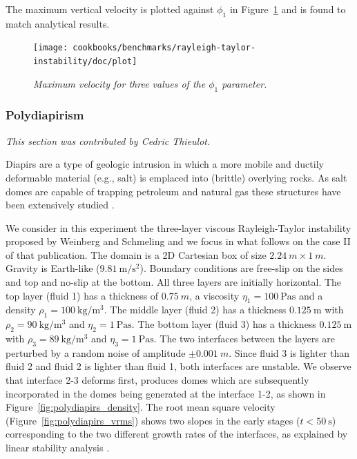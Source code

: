 \documentclass{article}
\begin{document}
The maximum vertical velocity is plotted against $\phi_1$ in Figure~\ref{fig:RTi_vels} and is found to match analytical results.

\begin{figure}
  \centering
  \texttt{[image: cookbooks/benchmarks/rayleigh-taylor-instability/doc/plot]}
  \caption{\it Maximum velocity for three values of the $\phi_1$ parameter.}
  \label{fig:RTi_vels}
\end{figure}

\subsubsection{Polydiapirism}
\label{sec:benchmark-polydiapirism}

\textit{This section was contributed by Cedric Thieulot.}

Diapirs are a type of geologic intrusion in which a more mobile and ductily deformable material (e.g., salt)
is emplaced into (brittle) overlying rocks. As salt domes are capable of trapping petroleum and
natural gas these structures have been extensively studied \cite{jahu17}.

We consider in this experiment the three-layer viscous Rayleigh-Taylor instability proposed
by Weinberg and Schmeling \cite{wesc92}
and we focus in what follows on the case II of that publication.
The domain is a 2D Cartesian box of size $2.24~\si{m} \times 1~\si{m}$.
Gravity is Earth-like ($9.81~\si{\meter\per\square\second}$).
Boundary conditions are free-slip on the sides and top and no-slip at the bottom.
All three layers are initially horizontal. The top layer (fluid 1) has a thickness of
$0.75~\si{m}$, a viscosity $\eta_1=100~\si{\pascal\second}$ and a density $\rho_1=100~\si{\kg\per\cubic\meter}$.
The middle layer (fluid 2) has a thickness $0.125~\si{\meter}$ with $\rho_2=90~\si{\kg\per\cubic\meter}$ and $\eta_2=1~\si{\pascal\second}$.
The bottom layer (fluid 3) has a thickness $0.125~\si{\meter}$ with $\rho_3=89~\si{\kg\per\cubic\meter}$ and $\eta_3=1~\si{\pascal\second}$.
The two interfaces between the layers are perturbed by a random noise of amplitude $\pm 0.001~\si{m}$.
Since fluid 3 is lighter than fluid 2 and fluid 2 is lighter than fluid 1, both interfaces are unstable.
We observe that interface 2-3 deforms first, produces domes which are subsequently incorporated in the domes
being generated at the interface 1-2, as shown in Figure~\ref{fig:polydiapirs_density}.
The root mean square velocity (Figure~\ref{fig:polydiapirs_vrms}) shows two slopes in the early stages ($t<50~\si{\second}$)
corresponding to the two different growth rates of the interfaces, as explained by linear stability analysis \cite{wesc92,ramb81}.
\end{document}
